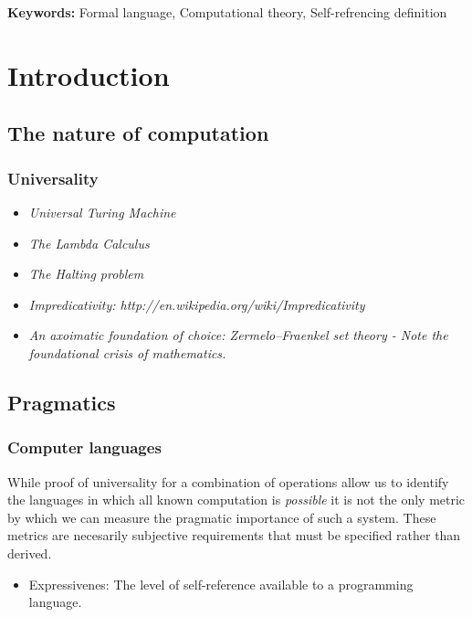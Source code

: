 \documentclass[11pt]{article}
\begin{document}
\textbf{Keywords:} Formal language, Computational theory, Self-refrencing definition	

\section{Introduction}

\subsection{The nature of computation}
\subsubsection{Universality}
\begin{itemize}
\item \emph { Universal Turing  Machine }\\
\item \emph { The Lambda Calculus }\\
\item \emph { The Halting problem }\\
\item \emph { Impredicativity: http://en.wikipedia.org/wiki/Impredicativity }\\
\item \emph { An axoimatic foundation of choice: Zermelo–Fraenkel set theory  - Note the foundational crisis of mathematics.}
\end{itemize}

\subsection{Pragmatics}
\subsubsection{Computer languages}

While proof of universality for a combination of operations allow us to identify the languages in which all known computation is \emph{possible} it is not the only metric by which we can measure the pragmatic importance of such a system.
These metrics are necesarily subjective requirements that must be specified rather than derived.

\begin{itemize}
\item Expressivenes: The level of self-reference available to a programming language.
\end{itemize}
\end{document}
